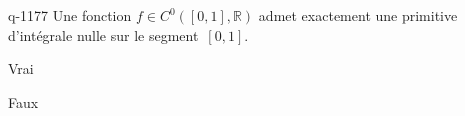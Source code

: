 \begin{truefalse}{q-1177}
Une fonction $f\in C^0([0,1],\mathbb{R})$ admet exactement une primitive d'intégrale nulle sur le segment~$[0,1]$.
\item* Vrai
\item Faux
\end{truefalse}


